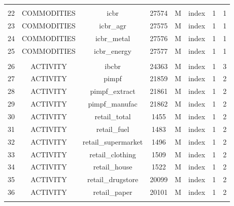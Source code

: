 \documentclass[12pt,openright,twoside,a4paper,brazil,english,emptypage,openany]{abntex2}
\begin{document}
\begin{table}[!htbp]
{\begin{tabular}{@{\extracolsep{5pt}} cccccccc}
\hline \\[-1.8ex]
22 & COMMODITIES & icbr & 27574 & M & index & 1 & 1 \\ 
23 & COMMODITIES & icbr\_agr & 27575 & M & index & 1 & 1 \\ 
24 & COMMODITIES & icbr\_metal & 27576 & M & index & 1 & 1 \\ 
25 & COMMODITIES & icbr\_energy & 27577 & M & index & 1 & 1 \\ 
\hline \\[-1.8ex]
26 & ACTIVITY & ibcbr & 24363 & M & index & 1 & 3 \\ 
27 & ACTIVITY & pimpf & 21859 & M & index & 1 & 2 \\ 
28 & ACTIVITY & pimpf\_extract & 21861 & M & index & 1 & 2 \\ 
29 & ACTIVITY & pimpf\_manufac & 21862 & M & index & 1 & 2 \\ 
30 & ACTIVITY & retail\_total & 1455 & M & index & 1 & 2 \\ 
31 & ACTIVITY & retail\_fuel & 1483 & M & index & 1 & 2 \\ 
32 & ACTIVITY & retail\_supermarket & 1496 & M & index & 1 & 2 \\ 
33 & ACTIVITY & retail\_clothing & 1509 & M & index & 1 & 2 \\ 
34 & ACTIVITY & retail\_house & 1522 & M & index & 1 & 2 \\ 
35 & ACTIVITY & retail\_drugstore & 20099 & M & index & 1 & 2 \\ 
36 & ACTIVITY & retail\_paper & 20101 & M & index & 1 & 2 \\ 
\hline \\[-1.8ex] 
\end{tabular} 
}
\end{table}
\end{document}
